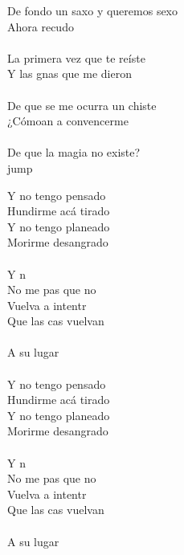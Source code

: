 \begin{cancion}[Arrancármelo][Wos]
	 De fondo un saxo y queremos sexo\\
	Ahora recudo\\
	\jump\\
La primera vez que te reíste\\
	Y las gnas que me dieron\\
	\jump\\
De que se me ocurra un chiste\\
	¿Cómoan a convencerme\\
	\jump\\
De que la magia no existe?\\jump\\
	\begin{chorus}%
	 Y no tengo pensado\\
	 Hundirme acá tirado\\
	 Y no tengo planeado\\
	 Morirme desangrado\\
	\jump\\
	Y n\\
	No me pas que no\\
	Vuelva a intentr\\
	Que las cas vuelvan\\
	\jump\\
A su lugar\\
	\jump\\
	 Y no tengo pensado\\
	 Hundirme acá tirado\\
	 Y no tengo planeado\\
	 Morirme desangrado\\
	\jump\\
	Y n\\
	No me pas que no\\
	Vuelva a intentr\\
	Que las cas vuelvan\\
	\jump\\
A su lugar\\
	\end{chorus}%
	\jump\\
\end{cancion}%
